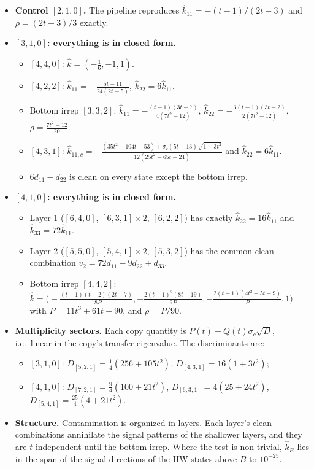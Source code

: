 \documentclass[11pt]{article}
\begin{document}
\begin{itemize}
\item \textbf{Control $[2,1,0]$.} The pipeline reproduces $\hat k_{11}=-(t-1)/(2t-3)$ and $\rho=(2t-3)/3$ exactly.
\item \textbf{$[3,1,0]$: everything is in closed form.}
  \begin{itemize}
  \item $[4,4,0]$: $\hat k=(-\tfrac16,-1,1)$.
  \item $[4,2,2]$: $\hat k_{11}=-\tfrac{5t-11}{24(2t-5)}$, $\hat k_{22}=6\hat k_{11}$.
  \item Bottom irrep $[3,3,2]$: $\hat k_{11}=-\tfrac{(t-1)(3t-7)}{4(7t^2-12)}$, $\hat k_{22}=-\tfrac{3(t-1)(3t-2)}{2(7t^2-12)}$, $\rho=\tfrac{7t^2-12}{20}$.
  \item $[4,3,1]$: $\hat k_{11,c}=-\tfrac{(35t^2-104t+53)+\sigma_c(5t-13)\sqrt{1+3t^2}}{12(25t^2-65t+24)}$ and $\hat k_{22}=6\hat k_{11}$.
  \item $6d_{11}-d_{22}$ is clean on every state except the bottom irrep.
  \end{itemize}
\item \textbf{$[4,1,0]$: everything is in closed form.}
  \begin{itemize}
  \item Layer 1 ($[6,4,0]$, $[6,3,1]\times2$, $[6,2,2]$) has exactly $\hat k_{22}=16\hat k_{11}$ and $\hat k_{33}=72\hat k_{11}$.
  \item Layer 2 ($[5,5,0]$, $[5,4,1]\times2$, $[5,3,2]$) has the common clean combination $v_2=72d_{11}-9d_{22}+d_{33}$.
  \item Bottom irrep $[4,4,2]$: $\hat k=\big(-\tfrac{(t-1)(t-2)(2t-7)}{18P},-\tfrac{2(t-1)^2(8t-19)}{9P},-\tfrac{2(t-1)(4t^2-5t+9)}{P},1\big)$ with $P=11t^3+61t-90$, and $\rho=P/90$.
  \end{itemize}
\item \textbf{Multiplicity sectors.} Each copy quantity is $P(t)+Q(t)\sigma_c\sqrt{D}$, i.e.\ linear in the copy's transfer eigenvalue. The discriminants are:
  \begin{itemize}
  \item $[3,1,0]$: $D_{[5,2,1]}=\tfrac14(256+105t^2)$, $D_{[4,3,1]}=16(1+3t^2)$;
  \item $[4,1,0]$: $D_{[7,2,1]}=\tfrac94(100+21t^2)$, $D_{[6,3,1]}=4(25+24t^2)$, $D_{[5,4,1]}=\tfrac{25}4(4+21t^2)$.
  \end{itemize}
\item \textbf{Structure.} Contamination is organized in layers. Each layer's clean combinations annihilate the signal patterns of the shallower layers, and they are $t$-independent until the bottom irrep. Where the test is non-trivial, $\hat k_B$ lies in the span of the signal directions of the HW states above $B$ to $10^{-25}$.

\end{itemize}
\end{document}
